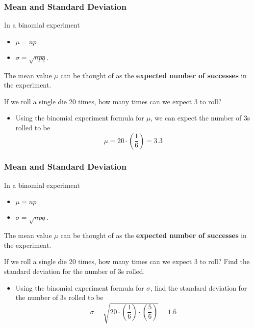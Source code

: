 \documentclass[Lecture.tex]{subfiles}
\begin{document}
\begin{frame}
\frametitle{Mean and Standard Deviation}\pause
In a binomial experiment
\begin{itemize}
\item $\mu=np$
\item $\sigma=\sqrt{npq}.$\pause
\end{itemize}
The mean value $\mu$ can be thought of as the \textbf{expected number of successes} in the experiment.
\begin{example}
If we roll a single die 20 times, how many times can we expect 3 to roll?
\end{example}\pause
\begin{itemize}
\item Using the binomial experiment formula for $\mu$, we can expect the number of 3s rolled to be 
$$\mu=20\cdot\left(\frac{1}{6}\right)=3.\overline{3}$$
\end{itemize}
\end{frame}

\begin{frame}
\frametitle{Mean and Standard Deviation}
In a binomial experiment
\begin{itemize}
\item $\mu=np$
\item $\sigma=\sqrt{npq}.$
\end{itemize}
The mean value $\mu$ can be thought of as the \textbf{expected number of successes} in the experiment.
\begin{example}
If we roll a single die 20 times, how many times can we expect 3 to roll?  Find the standard deviation for the number of 3s rolled.
\end{example}\pause
\begin{itemize}
\item Using the binomial experiment formula for $\sigma$, find the standard deviation for the number of 3s rolled to be
$$\sigma=\sqrt{20\cdot\left(\frac{1}{6}\right)\cdot\left(\frac{5}{6}\right)}=1.\overline{6}$$
\end{itemize}
\end{frame}
\end{document}
